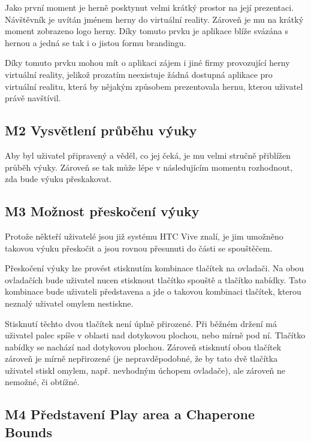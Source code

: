 Jako první moment je herně posktynut velmi krátký prostor na její
prezentaci. Návštěvník je uvítán jménem herny do virtuální
reality. Zároveň je mu na krátký moment zobrazeno logo herny. Díky
tomuto prvku je aplikace blíže svázána s hernou a jedná se tak i o
jistou formu brandingu.

Díky tomuto prvku mohou mít o aplikaci zájem i jiné firmy provozující
herny virtuální reality, jelikož prozatím neexistuje žádná dostupná
aplikace pro virtuální realitu, která by nějakým způsobem prezentovala
hernu, kterou uživatel právě navštívil.

\subsection{M2 Vysvětlení průběhu
výuky}\label{m2-vysvux11btlenuxed-prux16fbux11bhu-vuxfduky}

Aby byl uživatel připravený a věděl, co jej čeká, je mu velmi stručně
přiblížen průběh výuky. Zároveň se tak může lépe v následujícím momentu
rozhodnout, zda bude výuku přeskakovat.

\subsection{M3 Možnost přeskočení
výuky}\label{m3-moux17enost-pux159eskoux10denuxed-vuxfduky}

Protože někteří uživatelé jsou již systému HTC Vive znalí, je jim
umožněno takovou výuku přeskočit a jsou rovnou přesunuti do části se
spouštěčem.

Přeskočení výuky lze provést stisknutím kombinace tlačítek na ovladači.
Na obou ovladačích bude uživatel nucen stisknout tlačítko spouště a
tlačítko nabídky. Tato kombinace bude uživateli představena a jde o
takovou kombinaci tlačítek, kterou neznalý uživatel omylem nestiskne.

Stisknutí těchto dvou tlačítek není úplně přirozené. Při běžném držení
má uživatel palec spíše v oblasti nad dotykovou plochou, nebo mírně pod
ní. Tlačítko nabídky se nachází nad dotykovou plochou. Zároveň stisknutí
obou tlačítek zároveň je mírně nepřirozené (je nepravděpodobné, že by
tato dvě tlačítka uživatel stiskl omylem, např. nevhodným úchopem
ovladače), ale zároveň ne nemožné, či obtížné.

\subsection{M4 Představení Play area a Chaperone
Bounds}\label{m4-pux159edstavenuxed-play-area-a-chaperone-bounds}

